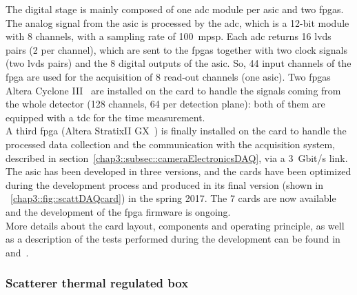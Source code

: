 The digital stage is mainly composed of one \gls{adc} module per \gls{asic} and two \glspl{fpga}. The analog signal from the \gls{asic} is processed by the \gls{adc}, which is a 12-bit module with 8 channels, with a sampling rate of 100~\gls{mpsp}. Each \gls{adc} returns 16 \gls{lvds} pairs (2 per channel), which are sent to the \glspl{fpga} together with two clock signals (two \gls{lvds} pairs) and the 8 digital outputs of the \gls{asic}. So, 44 input channels of the \gls{fpga} are used for the acquisition of 8 read-out channels (one \gls{asic}). Two \glspl{fpga} Altera Cyclone III~\parencite{Altera2012} are installed on the card to handle the signals coming from the whole detector (128 channels, 64 per detection plane): both of them are equipped with a \gls{tdc} for the time measurement.\\
A third \gls{fpga} (Altera StratixII GX~\parencite{Altera2009}) is finally installed on the card to handle the processed data collection and the communication with the acquisition system, described in section~\ref{chap3::subsec::cameraElectronicsDAQ}, via a 3~Gbit/s link.\\
The \gls{asic} has been developed in three versions, and the cards have been optimized during the development process and produced in its final version (shown in \figurename~\ref{chap3::fig::scattDAQcard}) in the spring 2017. The 7 cards are now available and the development of the \gls{fpga} firmware is ongoing.\\
More details about the card layout, components and operating principle, as well as a description of the tests performed during the development can be found in~\cite{Chen2017} and~\cite{Dahoumane2012}.    

\subsubsection{Scatterer thermal regulated box}\label{chap3::subsubsec::ScattThermBox}


